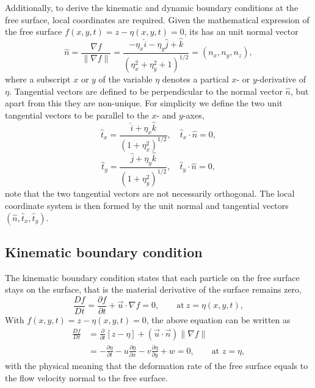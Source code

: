 Additionally, to derive the kinematic and dynamic boundary conditions at the free surface, local coordinates are required. Given the mathematical expression of the free surface $f(x,y,t)=z-\eta(x,y,t)=0$, its has an unit normal vector
\begin{equation}
    \hat{n} =\frac{\nabla f}{\| \nabla f\| } =\frac{-\eta _{x}\hat{i} -\eta _{y}\hat{j} +\hat{k}}{\left( \eta _{x}^{2} +\eta _{y}^{2} +1\right)^{1/2}} =( n_{x} ,n_{y} ,n_{z}),
    \label{eq:nv}
\end{equation}
where a subscript $x$ or $y$ of the variable $\eta$ denotes a partical $x$- or $y$-derivative of $\eta$. Tangential vectors are defined to be perpendicular to the normal vector $\hat{n}$, but apart from this they are non-unique. For simplicity we define the two unit tangential vectors to be parallel to the $x$- and $y$-axes,
\begin{equation}
    \hat{t}_{x} =\frac{\hat{i} +\eta _{x}\hat{k}}{\left( 1+\eta _{x}^{2}\right)^{1/2}} ,\quad \hat{t}_{x} \cdot \hat{n} =0,
\end{equation}
\begin{equation}
    \hat{t}_{y} =\frac{\hat{j} +\eta _{y}\hat{k}}{\left( 1+\eta _{y}^{2}\right)^{1/2}} ,\quad \hat{t}_{y} \cdot \hat{n} =0,
\end{equation}
note that the two tangential vectors are not necessarily orthogonal. The local coordinate system is then formed by the unit normal and tangential vectors $(\hat{n} ,\hat{t}_{x} ,\hat{t}_{y})$.

\subsection{Kinematic boundary condition}
The kinematic boundary condition states that each particle on the free surface stays on the surface, that is the material derivative of the surface remains zero,
\begin{equation}
    \frac{Df}{Dt} =\frac{\partial f}{\partial t} +\vec{u} \cdot \nabla f=0,\qquad \text{at}\ z=\eta(x,y,t),
\end{equation}
With $f(x,y,t)=z-\eta(x,y,t)=0$, the above equation can be written as
\begin{equation}
    \begin{split}
    \frac{Df}{Dt} &=\frac{\partial }{\partial t}[ z-\eta ] +(\vec{u} \cdot \vec{n}) \| \nabla f\| \\ 
    &=-\frac{\partial \eta }{\partial t} -u\frac{\partial \eta }{\partial x} -v\frac{\partial \eta }{\partial y}+w=0,\qquad \text{{at }} z=\eta,
    \end{split}
    \label{eq:kbc1}
\end{equation}
with the physical meaning that the deformation rate of the free surface equals to the flow velocity normal to the free surface. 

